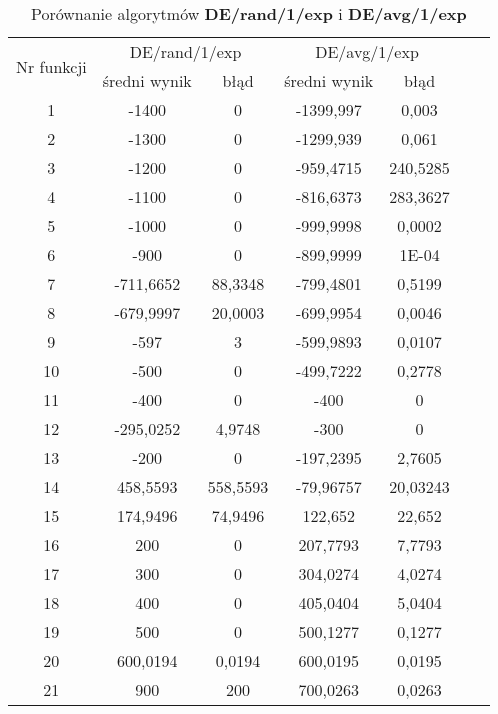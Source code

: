 \documentclass[a4paper,12pt]{article}
\theoremstyle{definition}
\begin{document}
\begin{table}[H]
\centering
\def\arraystretch{1.3}
\setlength\tabcolsep{10pt}
\caption{Porównanie algorytmów \textbf{DE/rand/1/exp} i \textbf{DE/avg/1/exp}}
\vspace{8pt}
\begin{tabular}{|c|c|c|c|c|c|c|}
	
	\hline
	\multirow{2}{*}{Nr funkcji} & \multicolumn{2}{c|}{DE/rand/1/exp} & \multicolumn{2}{c|}{DE/avg/1/exp}\\
	\cline{2-5}
	& średni wynik & błąd & średni wynik & błąd\\\hline
	1     & -1400 & 0     & -1399,997 & 0,003 \\\hline
    2     & -1300 & 0     & -1299,939 & 0,061 \\\hline
    3     & -1200 & 0     & -959,4715 & 240,5285 \\\hline
    4     & -1100 & 0     & -816,6373 & 283,3627 \\\hline
    5     & -1000 & 0     & -999,9998 & 0,0002 \\\hline
    6     & -900  & 0     & -899,9999 & 1E-04 \\\hline
    7     & -711,6652 & 88,3348 & -799,4801 & 0,5199 \\\hline
    8     & -679,9997 & 20,0003 & -699,9954 & 0,0046 \\\hline
    9     & -597  & 3     & -599,9893 & 0,0107 \\\hline
    10    & -500  & 0     & -499,7222 & 0,2778 \\\hline
    11    & -400  & 0     & -400  & 0 \\\hline
    12    & -295,0252 & 4,9748 & -300  & 0 \\\hline
    13    & -200  & 0     & -197,2395 & 2,7605 \\\hline
    14    & 458,5593 & 558,5593 & -79,96757 & 20,03243 \\\hline
    15    & 174,9496 & 74,9496 & 122,652 & 22,652 \\\hline
    16    & 200   & 0     & 207,7793 & 7,7793 \\\hline
    17    & 300   & 0     & 304,0274 & 4,0274 \\\hline
    18    & 400   & 0     & 405,0404 & 5,0404 \\\hline
    19    & 500   & 0     & 500,1277 & 0,1277 \\\hline
    20    & 600,0194 & 0,0194 & 600,0195 & 0,0195 \\\hline
    21    & 900   & 200   & 700,0263 & 0,0263 \\\hline

\end{tabular}
\end{table}
\end{document}
